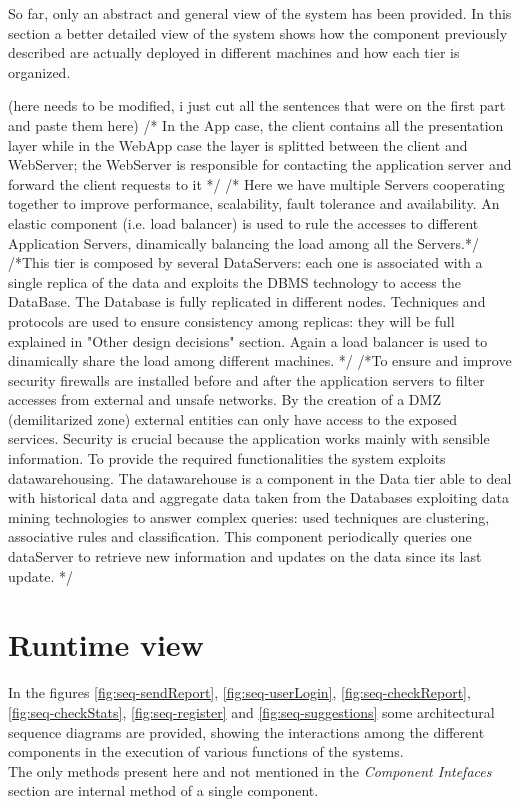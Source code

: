 \documentclass[a4paper]{report}
\begin{document}
So far, only an abstract and general view of the system has been provided. In this section a better detailed view of the system shows how the component previously described are actually deployed in different machines and how each tier is organized.


(here needs to be modified, i just cut all the sentences that were on the first part and paste them here)
 /* In the App case, the client contains all the presentation layer while in the WebApp case the layer is splitted between the client and WebServer; the WebServer is responsible for contacting the application server and forward the client requests to it */
 /* Here we have multiple Servers cooperating together to improve performance, scalability, fault tolerance and availability. An elastic component (i.e. load balancer) is used to rule the accesses to different Application Servers, dinamically balancing the load among all the Servers.*/
 /*This tier is composed by several DataServers: each one is associated with a single replica of the data and exploits the DBMS technology to access the DataBase. The Database is fully replicated in different nodes. Techniques and protocols are used to ensure consistency among replicas: they will be full explained in "Other design decisions" section. Again a load balancer is used to dinamically share the load among different machines. */
/*To ensure and improve security firewalls are installed before and after the application servers to filter accesses from external and unsafe networks. By the creation of a DMZ (demilitarized zone) external entities can only have access to the exposed services. Security is crucial because the application works mainly with sensible information.
To provide the required functionalities the system exploits datawarehousing. The datawarehouse is a component in the Data tier able to deal with historical data and aggregate data taken from the Databases exploiting data mining technologies to answer complex queries: used techniques are clustering, associative rules and classification. This component periodically queries one dataServer to retrieve new information and updates on the data since its last update. */
\section{Runtime view}
In the figures \ref{fig:seq-sendReport}, \ref{fig:seq-userLogin}, \ref{fig:seq-checkReport}, \ref{fig:seq-checkStats}, \ref{fig:seq-register} and \ref{fig:seq-suggestions} some architectural sequence diagrams are provided, showing the interactions among the different components in the execution of various functions of the systems. \\
The only methods present here and not mentioned in the \textit{Component Intefaces} section are internal method of a single component.
\end{document}
